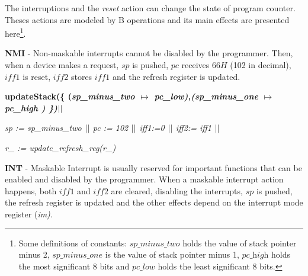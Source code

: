 \documentclass[a4paper]{llncs}
\begin{document}
The interruptions and the \textit{reset} action can change the state of
program counter. Theses actions are modeled by B operations and its main
effects are presented here\footnote{Some definitions of constants: $\textit{sp\_minus\_two}$ holds the value of stack pointer minus 2,
 $\textit{sp\_minus\_one}$ is the value of stack pointer minus 1,
$\textit{pc\_high}$ holds the most significant 8 bits and
$\textit{pc\_low}$ holds the least significant 8 bits.}.


 \textbf{NMI} - Non-maskable interrupts cannot be disabled
 by the programmer. Then, when a device makes a request, $sp$ is pushed,
 $pc$ receives $66H$ (102 in decimal), $\textit{iff1}$ is reset, $\textit{iff2}$ stores
 $\textit{iff1}$ and the refresh register is updated.
  
\begin{sloppypar}
\bf updateStack\rm (\rm \{ \rm (\it sp\_minus\_two  $\mapsto$  \it pc\_low\rm )\rm ,\rm (\it sp\_minus\_one  $\mapsto$ \it pc\_high \rm ) \rm \}\rm )$\mbox{$\mid\mid$}$

\it sp \rm := \it sp\_minus\_two  $\mbox{$\mid\mid$}$ \it pc \rm := \rm 1\rm 0\rm 2 $\mbox{$\mid\mid$}$ \it iff1\rm :=\rm 0  $\mbox{$\mid\mid$}$  \it iff2\rm := \it iff1 $\mbox{$\mid\mid$}$

\it r\_ \rm := \it update\_refresh\_reg\rm (\it r\_\rm )\\
\end{sloppypar}

  \textbf{INT} - Maskable Interrupt is usually reserved for important functions that can be enabled and
  disabled by the programmer. When a maskable interrupt action happens, both $\textit{iff1}$ and $\textit{iff2}$ are
  cleared, disabling the interrupts, $sp$ is pushed, the refresh register is updated and the other effects
  depend on the interrupt mode register (\it im\rm).
 
\end{document}
